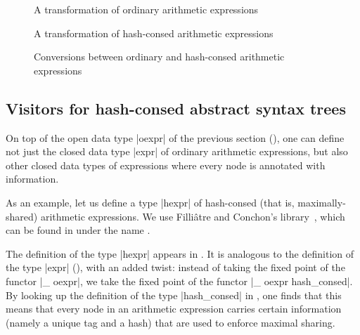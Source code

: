 \documentclass[11pt,a4paper,twoside]{article}
\begin{document}

\begin{figure}[p]
\caption{A transformation of ordinary arithmetic expressions}
\label{fig:expr13double}
\end{figure}

\begin{figure}[p]
\caption{A transformation of hash-consed arithmetic expressions}
\label{fig:expr08double}
\end{figure}

\begin{figure}[p]
\caption{Conversions between ordinary and hash-consed arithmetic expressions}
\label{fig:expr14}
\end{figure}

\subsection{Visitors for hash-consed abstract syntax trees}
\label{sec:advanced:hashconsed}

On top of the open data type \oc|oexpr| of the previous section
(), one can define not just the closed data type
\oc|expr| of ordinary arithmetic expressions, but also other closed data types
of expressions where every node is annotated with information.

As an example, let us define a type \oc|hexpr| of hash-consed (that is,
maximally-shared) arithmetic expressions. We use Filliâtre and Conchon's
library~\cite{filliatre-conchon-06}, which can be found in \opam under the
name \hashcons.

The definition of the type \oc|hexpr| appears in . It is
analogous to the definition of the type \oc|expr| (), with an
added twist: instead of taking the fixed point of the functor \oc|_ oexpr|, we
take the fixed point of the functor \oc|_ oexpr hash_consed|. By looking up
the definition of the type \oc|hash_consed| in ,
one finds that this means that every node in an arithmetic expression carries
certain information (namely a unique tag and a hash) that are used to enforce
maximal sharing.
\end{document}
